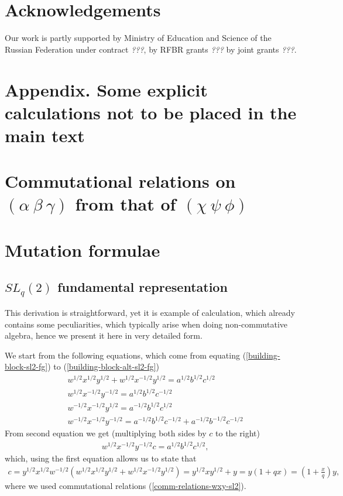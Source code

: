 \documentclass{article}
\newcommand{\lb}{\left (}
\newcommand{\rb}{\right )}
\newcommand{\be}{\begin{eqnarray}}
\newcommand{\ee}{\end{eqnarray}}
\newcommand {\?}{\textit{???}}
\newcommand{\delabel}[1]{(\ref{#1})}
\begin{document}
\section*{Acknowledgements}

Our work is partly supported by Ministry of Education and Science of
the Russian Federation under contract \?, by RFBR
grants \? by joint grants \?.

\appendix
\section{Appendix. Some explicit calculations not to be placed in the main text}

\section{Commutational relations on $(\alpha\ \beta\ \gamma)$ from that of $(\chi\ \psi\ \phi)$}
\label{alpha-beta-gamma-from-chi-psi-phi}

\section{Mutation formulae}
\subsection{$SL_q(2)$ fundamental representation}
\label{derivation-of-quantum-mutation-sl2}
This derivation is straightforward, yet it is example of calculation,
which already contains some peculiarities, which typically arise when doing non-commutative algebra,
hence we present it here in very detailed form.

We start from the following equations, which come from equating \delabel{building-block-sl2-fg} to \delabel{building-block-alt-sl2-fg}
\be
& w^{1/2}x^{1/2} y^{1/2} + w^{1/2}x^{-1/2}y^{1/2} = a^{1/2}b^{1/2}c^{1/2} \\
& w^{1/2}x^{-1/2}y^{-1/2} = a^{1/2}b^{1/2}c^{-1/2} \\
& w^{-1/2}x^{-1/2}y^{1/2} = a^{-1/2}b^{1/2}c^{1/2} \\
& w^{-1/2}x^{-1/2}y^{-1/2} = a^{-1/2}b^{1/2}c^{-1/2} + a^{-1/2}b^{-1/2}c^{-1/2}
\ee
From second equation we get (multiplying both sides by $c$ to the right)
\be
& w^{1/2}x^{-1/2}y^{-1/2} c = a^{1/2}b^{1/2}c^{1/2},
\ee
which, using the first equation allows us to state that
\be
c = y^{1/2}x^{1/2}w^{-1/2}\lb w^{1/2}x^{1/2}y^{1/2} + w^{1/2}x^{-1/2}y^{1/2} \rb
= y^{1/2} x y^{1/2} + y = y\lb 1 + qx\rb = \lb 1 + \frac{x}{q} \rb y,
\ee
where we used commutational relations \delabel{comm-relations-wxy-sl2}.
\end{document}
